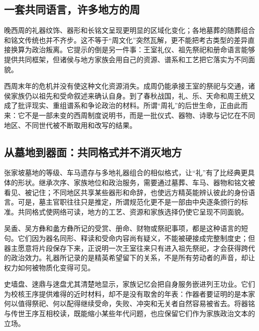 \subsection{一套共同语言，许多地方的周}

晚西周的礼器纹饰、器形和长铭文呈现更明显的区域化变化；各地墓葬的随葬组合和铭文传统也并不齐步。这不等于“周文化”突然瓦解，更不能把考古类型的差异直接换算为政治叛离。它提示的倒是另一件事：王室礼仪、祖先祭祀和册命语言能够提供共同框架，但诸侯与地方家族会用自己的资源、谱系和工艺把它落实为不同面貌。

西周末年的危机并没有使这种文化资源消失。成周仍能承接王室的祭祀与交通，诸侯家族仍以祖先和受命叙述来确认自身。到了春秋战国，礼、乐、天命和周王统又成了批评现实、重组谱系和争论政治的材料。所谓“周礼”的后世生命，正由此而来：它不是一部未变的西周制度说明书，而是一批仪式、器物、诗歌与记忆在不同地区、不同世代被不断取用和改写的结果。

\subsection{从墓地到器面：共同格式并不消灭地方}

张家坡墓地的等级、车马遗存与多地礼器组合的相似格式，让“礼”有了比经典更具体的形状。继承次序、家族地位和政治服务，需要通过墓葬、车马、器物和铭文被看见、被记住；不同地区共享某些器形和命辞，也使远方精英能辨认彼此的身份语言。可是，墓主官职往往只是推定，所谓规范化更不是一部由中央逐条颁行的标准。共同格式使网络可读，地方的工艺、资源和家族选择仍使它呈现不同面貌。

吴盉、吴方彝和盠方彝所记的受赏、册命、财物或祭祀事项，都是这种语言的短句。它们因为器名同形、释读和受命内容尚有疑义，不能被硬接成完整制度史；但器主愿意将片段保存下来，正说明一次王室往来只有进入祖先祭祀，才会获得跨代的政治效力。礼器所记录的是精英希望留下的关系，不是所有劳动者的声音，却让权力如何被物质化变得可见。

史墙盘、逨鼎与逨盘尤其清楚地显示，家族记忆会把自身服务嵌进列王功业。它们为校核王序提供难得的近时材料，却不是没有取舍的年表：作器者要证明的是本家何以值得祭祀、何以配得继续受命，失败、冲突和无关者自然容易被省去。将器铭与传世王序互相校读，既能缩小某些年代问题，也应保留它们作为家族政治文本的立场。

